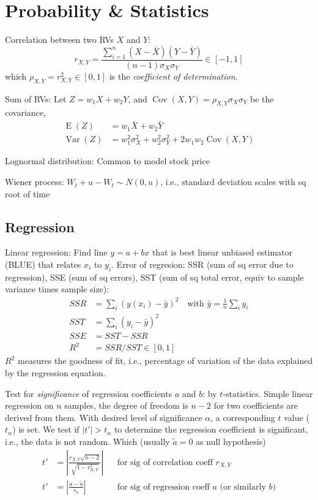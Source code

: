 \documentclass[9pt,twocolumn]{extarticle}
\DeclareMathOperator{\E}{E}
\DeclareMathOperator{\Var}{Var}
\DeclareMathOperator{\Cov}{Cov}
\begin{document}
\section{Probability \& Statistics}
Correlation between two RVs $X$ and $Y$:
$$ r_{X,Y} = \frac{\sum_{i=1}^n (X-\bar{X})(Y-\bar{Y})}{(n-1)\sigma_X\sigma_Y} \in [-1, 1]$$
which $\rho_{X,Y}=r_{X,Y}^2\in[0,1]$ is the \emph{coefficient of determination}.

Sum of RVs: Let $Z = w_1X+w_2Y$, and $\Cov(X,Y) = \rho_{X,Y}\sigma_X\sigma_Y$ be the covariance,
\begin{align*}
\E(Z) &= w_1\bar{X} + w_2\bar{Y} \\
\Var(Z) &= w_1^2 \sigma_X^2 + w_2^2 \sigma_Y^2 + 2w_1w_2 \Cov(X,Y)
\end{align*}

Lognormal distribution: Common to model stock price

Wiener process: $W_t+u - W_t \sim N(0,u)$, i.e., standard deviation scales with sq root of time

\subsection*{Regression}

Linear regression: Find line $y=a+bx$ that is best linear unbiased estimator
(BLUE) that relates $x_i$ to $y_i$. Error of regresion: SSR (sum of sq error
due to regression), SSE (sum of sq errors), SST (sum of sq total error, equiv to
sample variance times sample size):
\begin{align*}
SSR &= \sum_i (y(x_i) - \bar{y})^2 \quad \textrm{with }\bar{y} = \frac{1}{n}\sum_i y_i \\
SST &= \sum_i (y_i - \bar{y})^2 \\
SSE &= SST - SSR \\
R^2 &= SSR/SST \in [0,1]
\end{align*}
$R^2$ measures the goodness of fit, i.e., percentage of variation of the data explained by the
regression equation.

Test for \emph{significance} of regression coefficients $a$ and $b$: by
$t$-statistics. Simple linear regression on $n$ samples, the degree of freedom
is $n-2$ for two coefficients are derived from them. With desired level of
significance $\alpha$, a corresponding $t$ value ($t_{\alpha}$) is set. We test
if $|t'| > t_{\alpha}$ to determine the regression coefficient is significant,
i.e., the data is not random. Which (usually $\tilde{a}=0$ as null hypothesis)
\begin{align*}
t' &= \left|\frac{r_{X,Y}\sqrt{n-2}}{\sqrt{1-r_{X,Y}^2}}\right| & & \textrm{for sig of correlation coeff $r_{X,Y}$} \\
t' &= \left|\frac{a-\tilde{a}}{s_a}\right| & & \textrm{for sig of regression coeff $a$ (or similarly $b$)}
\end{align*}
\end{document}
